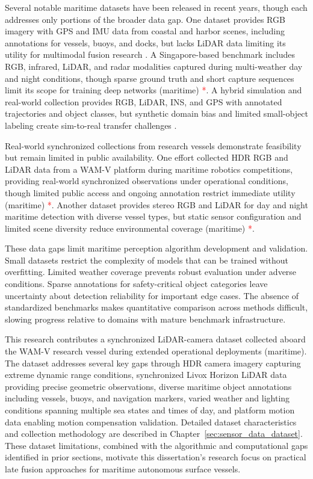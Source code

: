\documentclass[../main.tex]{subfiles}
\begin{document}
Several notable maritime datasets have been released in recent years, though each addresses only portions of the broader data gap. One dataset provides RGB imagery with GPS and IMU data from coastal and harbor scenes, including annotations for vessels, buoys, and docks, but lacks LiDAR data limiting its utility for multimodal fusion research \cite{su2023}. A Singapore-based benchmark includes RGB, infrared, LiDAR, and radar modalities captured during multi-weather day and night conditions, though sparse ground truth and short capture sequences limit its scope for training deep networks (maritime) \textcolor{red}{*}. A hybrid simulation and real-world collection provides RGB, LiDAR, INS, and GPS with annotated trajectories and object classes, but synthetic domain bias and limited small-object labeling create sim-to-real transfer challenges \cite{huang2025}.

Real-world synchronized collections from research vessels demonstrate feasibility but remain limited in public availability. One effort collected HDR RGB and LiDAR data from a WAM-V platform during maritime robotics competitions, providing real-world synchronized observations under operational conditions, though limited public access and ongoing annotation restrict immediate utility (maritime) \textcolor{red}{*}. Another dataset provides stereo RGB and LiDAR for day and night maritime detection with diverse vessel types, but static sensor configuration and limited scene diversity reduce environmental coverage (maritime) \textcolor{red}{*}.

These data gaps limit maritime perception algorithm development and validation. Small datasets restrict the complexity of models that can be trained without overfitting. Limited weather coverage prevents robust evaluation under adverse conditions. Sparse annotations for safety-critical object categories leave uncertainty about detection reliability for important edge cases. The absence of standardized benchmarks makes quantitative comparison across methods difficult, slowing progress relative to domains with mature benchmark infrastructure.

This research contributes a synchronized LiDAR-camera dataset collected aboard the WAM-V research vessel during extended operational deployments (maritime). The dataset addresses several key gaps through HDR camera imagery capturing extreme dynamic range conditions, synchronized Livox Horizon LiDAR data providing precise geometric observations, diverse maritime object annotations including vessels, buoys, and navigation markers, varied weather and lighting conditions spanning multiple sea states and times of day, and platform motion data enabling motion compensation validation. Detailed dataset characteristics and collection methodology are described in Chapter~\ref{sec:sensor_data_dataset}. These dataset limitations, combined with the algorithmic and computational gaps identified in prior sections, motivate this dissertation's research focus on practical late fusion approaches for maritime autonomous surface vessels.
\end{document}
